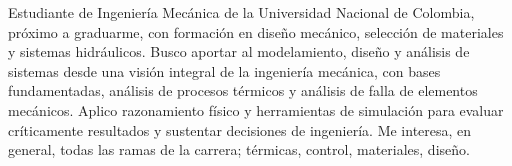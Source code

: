 

\begin{cvparagraph}


Estudiante de Ingeniería Mecánica de la Universidad Nacional de Colombia, próximo a graduarme, con formación en diseño mecánico, selección de materiales y sistemas hidráulicos. Busco aportar al modelamiento, diseño y análisis de sistemas desde una visión integral de la ingeniería mecánica, con bases fundamentadas, análisis de procesos térmicos y análisis de falla de elementos mecánicos. Aplico razonamiento físico y herramientas de simulación para evaluar críticamente resultados y sustentar decisiones de ingeniería. Me interesa, en general, todas las ramas de la carrera; térmicas, control, materiales, diseño.
\end{cvparagraph}
